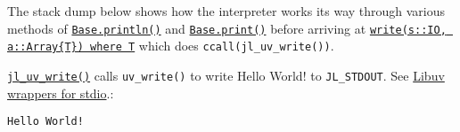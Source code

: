 The stack dump below shows how the interpreter works its way through various methods of \hyperlink{783803254548423222}{\texttt{Base.println()}} and \hyperlink{8248717042415202230}{\texttt{Base.print()}} before arriving at \href{https://github.com/JuliaLang/julia/blob/master/base/stream.jl}{\texttt{write(s::IO, a::Array\{T\}) where T}}  which does \texttt{ccall(jl\_uv\_write())}.



\href{https://github.com/JuliaLang/julia/blob/master/src/jl\_uv.c}{\texttt{jl\_uv\_write()}} calls \texttt{uv\_write()} to write {\textquotedbl}Hello World!{\textquotedbl} to \texttt{JL\_STDOUT}. See \hyperlink{11668969309999094552}{Libuv wrappers for stdio}.:




\begin{lstlisting}
Hello World!
\end{lstlisting}




